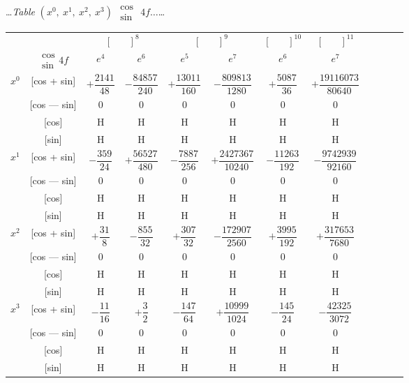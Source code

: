 \documentclass[10pt,a4paper]{article}
\newcommand{\tabletitle}[2]{%
  \begin{center}
  \ldots\textit{Table} #1 $\displaystyle\begin{smallmatrix} \cos \\ \sin \end{smallmatrix}$ #2\ldots
  \end{center}
}
\begin{document}
\vspace{1em}

\tabletitle{$(x^0,\ x^1,\ x^2,\ x^3)$}{$4f\ldots$}

\begin{center}
\small
\begin{tabular}{|c|c|c|c|c|c|c|c|c|c|c|c|}
\hline
& & \multicolumn{2}{c|}{$[\phantom{()}]^8$} & \multicolumn{2}{c|}{$[\phantom{()}]^9$} & \multicolumn{1}{c|}{$[\phantom{()}]^{10}$} & \multicolumn{1}{c|}{$[\phantom{()}]^{11}$} \\
\cline{3-8}
& $\begin{smallmatrix} \cos \\ \sin \end{smallmatrix} 4f$ & $e^4$ & $e^6$ & $e^5$ & $e^7$ & $e^6$ & $e^7$ \\
\hline
\multirow{4}{*}{$x^0$} & [cos + sin] & $+\dfrac{2141}{48}$ & $-\dfrac{84857}{240}$ & $+\dfrac{13011}{160}$ & $-\dfrac{809813}{1280}$ & $+\dfrac{5087}{36}$ & $+\dfrac{19116073}{80640}$ \\
& [cos --- sin] & $0$ & $0$ & $0$ & $0$ & $0$ & $0$ \\
& [cos] & H & H & H & H & H & H \\
& [sin] & H & H & H & H & H & H \\
\hline
\multirow{4}{*}{$x^1$} & [cos + sin] & $-\dfrac{359}{24}$ & $+\dfrac{56527}{480}$ & $-\dfrac{7887}{256}$ & $+\dfrac{2427367}{10240}$ & $-\dfrac{11263}{192}$ & $-\dfrac{9742939}{92160}$ \\
& [cos --- sin] & $0$ & $0$ & $0$ & $0$ & $0$ & $0$ \\
& [cos] & H & H & H & H & H & H \\
& [sin] & H & H & H & H & H & H \\
\hline
\multirow{4}{*}{$x^2$} & [cos + sin] & $+\dfrac{31}{8}$ & $-\dfrac{855}{32}$ & $+\dfrac{307}{32}$ & $-\dfrac{172907}{2560}$ & $+\dfrac{3995}{192}$ & $+\dfrac{317653}{7680}$ \\
& [cos --- sin] & $0$ & $0$ & $0$ & $0$ & $0$ & $0$ \\
& [cos] & H & H & H & H & H & H \\
& [sin] & H & H & H & H & H & H \\
\hline
\multirow{4}{*}{$x^3$} & [cos + sin] & $-\dfrac{11}{16}$ & $+\dfrac{3}{2}$ & $-\dfrac{147}{64}$ & $+\dfrac{10999}{1024}$ & $-\dfrac{145}{24}$ & $-\dfrac{42325}{3072}$ \\
& [cos --- sin] & $0$ & $0$ & $0$ & $0$ & $0$ & $0$ \\
& [cos] & H & H & H & H & H & H \\
& [sin] & H & H & H & H & H & H \\
\hline
\end{tabular}
\end{center}
\end{document}
